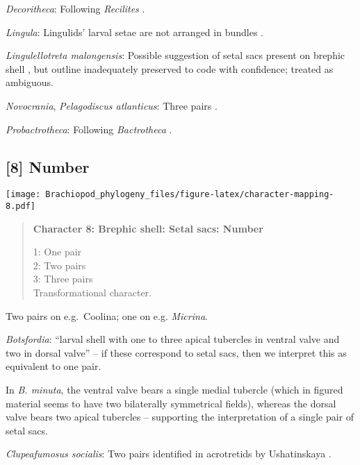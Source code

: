\documentclass[openany]{book}
\theoremstyle{definition}
\theoremstyle{definition}
\theoremstyle{definition}
\theoremstyle{remark}
\begin{document}
\hypertarget{Decoritheca-coding-7}{}
\emph{Decoritheca}: Following \emph{Recilites} \citep{Dzik1978}.

\hypertarget{Lingula-coding-7}{}
\emph{Lingula}: Lingulids' larval setae are not arranged in bundles
\citep{Carlson1995Phylogeneticrelationships}.

\hypertarget{Lingulellotreta_malongensis-coding-7}{}
\emph{Lingulellotreta malongensis}: Possible suggestion of setal sacs
present on brephic shell \citep{Holmer1997EarlyCambrian, Li2004}, but
outline inadequately preserved to code with confidence; treated as
ambiguous.

\hypertarget{Novocrania-coding-7}{}
\emph{Novocrania}, \emph{Pelagodiscus atlanticus}: Three pairs
\citep{Carlson1995Phylogeneticrelationships}.

\hypertarget{Probactrotheca-coding-7}{}
\emph{Probactrotheca}: Following \emph{Bactrotheca}
\citep{Dzik1980Ontogenyof}.

\subsection*{{[}8{]} Number}\label{number}

\texttt{[image: Brachiopod\_phylogeny\_files/figure-latex/character-mapping-8.pdf]}

\begin{quote}
\textbf{Character 8: Brephic shell: Setal sacs: Number}

1: One pair\\
2: Two pairs\\
3: Three pairs\\
Transformational character.
\end{quote}

Two pairs on e.g.~Coolina; one on e.g. \emph{Micrina}.

\hypertarget{Botsfordia-coding-8}{}
\emph{Botsfordia}: ``larval shell with one to three apical tubercles in
ventral valve and two in dorsal valve''
\citep{Williams2000LinguliformeaCraniiformea} -- if these correspond to
setal sacs, then we interpret this as equivalent to one pair.

In \emph{B. minuta}, the ventral valve bears a single medial tubercle
(which in figured material seems to have two bilaterally symmetrical
fields), whereas the dorsal valve bears two apical tubercles
\citep{Li2004} -- supporting the interpretation of a single pair of
setal sacs.

\hypertarget{Clupeafumosus_socialis-coding-8}{}
\emph{Clupeafumosus socialis}: Two pairs identified in acrotretids by
Ushatinskaya \citeyearpar{Ushatinskaya2016Protegulumand}.
\end{document}

